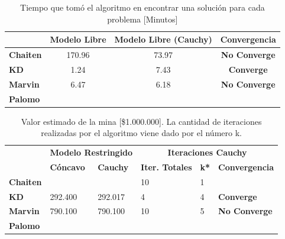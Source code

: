 \documentclass[12pt,letterpaper]{article}
\begin{document}
\begin{table}[H]
\centering
\begin{tabular}{|l|ccc|}
\hline
                 & \textbf{Modelo Libre} & \textbf{Modelo Libre (Cauchy)} & \textbf{Convergencia}  \\ \hline
\textbf{Chaiten} &  170.96              & 73.97            & \textbf{No Converge}                              \\ \hline
\textbf{KD}      &  1.24            & 7.43             & \textbf{Converge}                                     \\ \hline
\textbf{Marvin}  &  6.47                & 6.18             & \textbf{No Converge}                                    \\ \hline
\textbf{Palomo}  &                  &             &      \textbf{}                              \\ \hline
\end{tabular}
\caption{Tiempo que tomó el algoritmo en encontrar una solución para cada problema
[Minutos]}
\end{table}

\begin{table}[H]
\centering
\begin{tabular}{|l|ll|lll|}
\hline
                 & \multicolumn{2}{c|}{\textbf{Modelo Restringido}} & \multicolumn{3}{c|}{\textbf{Iteraciones Cauchy}}                   \\ \cline{2-6} 
                 & \textbf{Cóncavo}         & \textbf{Cauchy}       & \textbf{Iter. Totales} & \textbf{k*} & \textbf{Convergencia} \\ \hline
\textbf{Chaiten} &               &           & 10                           & 1           & \textbf{}           \\ \hline
\textbf{KD}      &     292.400        & 292.017            &      4                    & 4          & \textbf{Converge}              \\ \hline
\textbf{Marvin}  &      790.100       & 790.100             & 10                         & 5           & \textbf{No Converge}           \\ \hline
\textbf{Palomo}  &                 &                        &                              &             & \textbf{}         \\ \hline
\end{tabular}
\caption{Valor estimado de la mina [\$1.000.000]. La cantidad de iteraciones realizadas por el algoritmo viene dado por el número k.}
\end{table}
\end{document}
